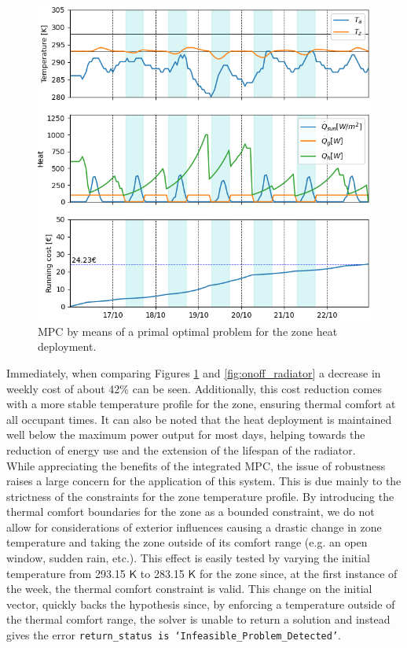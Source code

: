 \begin{figure}[H]
\centering
\includegraphics[scale=0.8]{images/mpc_primal.png}
\caption{MPC by means of a primal optimal problem for the zone heat deployment.}
\label{fig:mpc_primal}
\end{figure}

Immediately, when comparing Figures \ref{fig:mpc_primal} and \ref{fig:onoff_radiator} a decrease in weekly cost of about 42\% can be seen. Additionally, this cost reduction comes with a more stable temperature profile for the zone, ensuring thermal comfort at all occupant times. It can also be noted that the heat deployment is maintained well below the maximum power output for most days, helping towards the reduction of energy use and the extension of the lifespan of the radiator.\\

While appreciating the benefits of the integrated MPC, the issue of robustness raises a large concern for the application of this system. This is due mainly to the strictness of the constraints for the zone temperature profile. By introducing the thermal comfort boundaries for the zone as a bounded constraint, we do not allow for considerations of exterior influences causing a drastic change in zone temperature and taking the zone outside of its comfort range (e.g. an open window, sudden rain, etc.). This effect is easily tested by varying the initial temperature from 293.15 $\mathsf{K}$ to 283.15 $\mathsf{K}$ for the zone since, at the first instance of the week, the thermal comfort constraint is valid. This change on the initial vector, quickly backs the hypothesis since, by enforcing a temperature outside of the thermal comfort range, the solver is unable to return a solution and instead gives the error \texttt{return\_status is `Infeasible\_Problem\_Detected'}.\\

